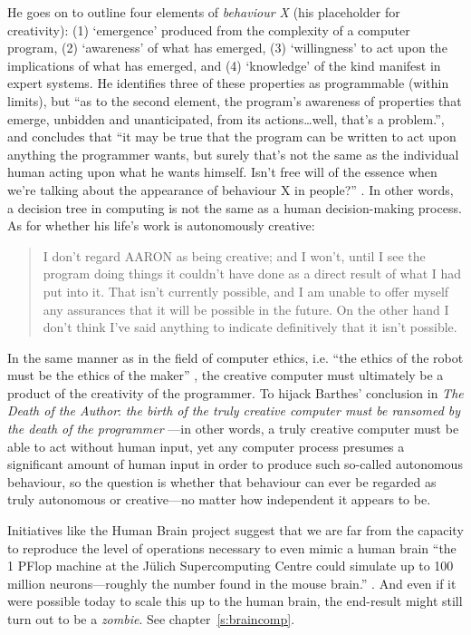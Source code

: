 He goes on to outline four elements of \emph{behaviour X} (his placeholder for creativity): (1) `emergence' produced from the complexity of a computer program, (2) `awareness' of what has emerged, (3) `willingness' to act upon the implications of what has emerged, and (4) `knowledge' of the kind manifest in expert systems. He identifies three of these properties as programmable (within limits), but ``as to the second element, the program\rq s awareness of properties that emerge, unbidden and unanticipated, from its actions\ldots  well, that\rq s a problem.'', and concludes that ``it may be true that the program can be written to act upon anything the programmer wants, but surely that\rq s not the same as the individual human acting upon what he wants himself. Isn\rq t free will of the essence when we\rq re talking about the appearance of behaviour X in people?'' \autocite{Cohen1999}. In other words, a decision tree in computing is not the same as a human decision-making process. As for whether his life's work is autonomously creative:

\begin{quotation}
  I don't regard AARON as being creative; and I won't, until I see the program doing things it couldn't have done as a direct result of what I had put into it. That isn't currently possible, and I am unable to offer myself any assurances that it will be possible in the future. On the other hand I don't think I've said anything to indicate definitively that it isn't possible. 
\end{quotation}

In the same manner as in the field of computer ethics, i.e. ``the ethics of the robot must be the ethics of the maker'' \autocite{Mcbride2012}, the creative computer must ultimately be a product of the creativity of the programmer. To hijack Barthes' conclusion in \textit{The Death of the Author}: \emph{the birth of the truly creative computer must be ransomed by the death of the programmer} \autocite[adapted from][]{Barthes1967}---in other words, a truly creative computer must be able to act without human input, yet any computer process presumes a significant amount of human input in order to produce such so-called autonomous behaviour, so the question is whether that behaviour can ever be regarded as truly autonomous or creative---no matter how independent it appears to be.

Initiatives like the Human Brain project suggest that we are far from the capacity to reproduce the level of operations necessary to even mimic a human brain ``the 1 PFlop machine at the J{\"u}lich Supercomputing Centre could simulate up to 100 million neurons---roughly the number found in the mouse brain.'' \autocite{Walker2012}. And even if it were possible today to scale this up to the human brain, the end-result might still turn out to be a \emph{zombie}. See chapter~\ref{s:braincomp}.

